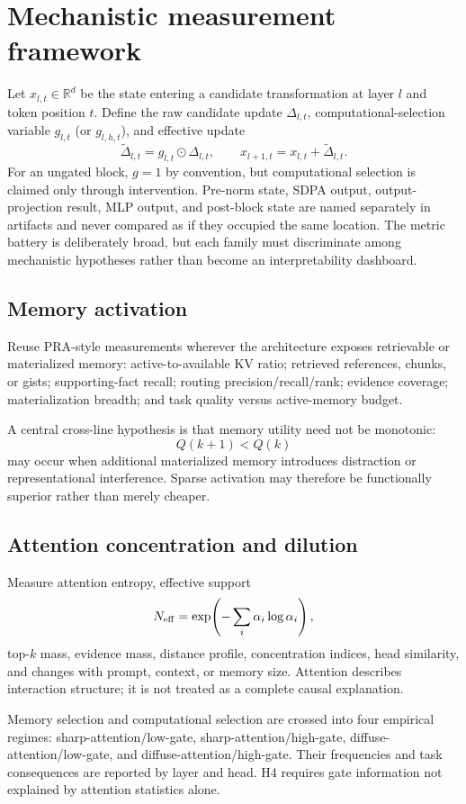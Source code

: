 \documentclass[10pt]{article}
\begin{document}
\section{Mechanistic measurement framework}
Let $x_{l,t}\in\mathbb{R}^d$ be the state entering a candidate transformation at layer $l$ and token position $t$. Define the raw candidate update $\Delta_{l,t}$, computational-selection variable $g_{l,t}$ (or $g_{l,h,t}$), and effective update
\[
\widetilde{\Delta}_{l,t}=g_{l,t}\odot\Delta_{l,t},
\qquad
x_{l+1,t}=x_{l,t}+\widetilde{\Delta}_{l,t}.
\]
For an ungated block, $g=1$ by convention, but computational selection is claimed only through intervention. Pre-norm state, SDPA output, output-projection result, MLP output, and post-block state are named separately in artifacts and never compared as if they occupied the same location.
The metric battery is deliberately broad, but each family must discriminate among mechanistic hypotheses rather than become an interpretability dashboard.

\subsection{Memory activation}
Reuse PRA-style measurements wherever the architecture exposes retrievable or materialized memory: active-to-available KV ratio; retrieved references, chunks, or gists; supporting-fact recall; routing precision/recall/rank; evidence coverage; materialization breadth; and task quality versus active-memory budget.

A central cross-line hypothesis is that memory utility need not be monotonic:
\[
Q(k+1)<Q(k)
\]
may occur when additional materialized memory introduces distraction or representational interference. Sparse activation may therefore be functionally superior rather than merely cheaper.

\subsection{Attention concentration and dilution}
Measure attention entropy, effective support
\[
N_{\rm eff}=\exp\!\left(-\sum_i\alpha_i\log\alpha_i\right),
\]
top-$k$ mass, evidence mass, distance profile, concentration indices, head similarity, and changes with prompt, context, or memory size. Attention describes interaction structure; it is not treated as a complete causal explanation.

Memory selection and computational selection are crossed into four empirical regimes: sharp-attention/low-gate, sharp-attention/high-gate, diffuse-attention/low-gate, and diffuse-attention/high-gate. Their frequencies and task consequences are reported by layer and head. H4 requires gate information not explained by attention statistics alone.
\end{document}
